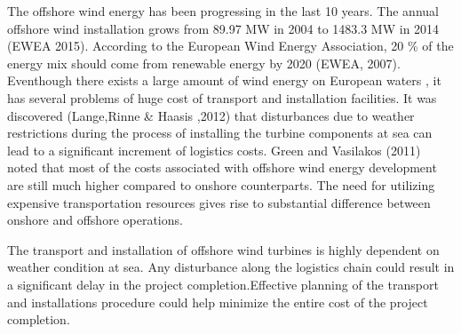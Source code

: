 \begin{introduction}

The offshore wind energy has been progressing in the last 10 years. The annual offshore wind installation grows from 89.97 MW in 2004 to 1483.3 MW in 2014 (EWEA 2015). According to the European Wind Energy Association, 20 \% of the energy mix should come from renewable energy by 2020 (EWEA, 2007). Eventhough there exists a large amount of wind energy on European waters , it has several problems of huge cost of transport and installation facilities. It was discovered (Lange,Rinne & Haasis ,2012) that disturbances due to weather restrictions during the process of installing the turbine components at sea can lead to a significant increment of logistics costs. Green and Vasilakos (2011) noted that most of the costs associated with offshore wind energy development are still much higher compared to onshore counterparts. The need for utilizing expensive transportation resources gives rise to substantial difference between onshore and offshore operations. 

The transport and installation of offshore wind turbines is highly dependent on weather condition at sea. Any disturbance along the logistics chain could result in a significant delay in the project completion.Effective planning of the transport and installations procedure could help minimize the entire cost of the project completion.

\end{introduction}
